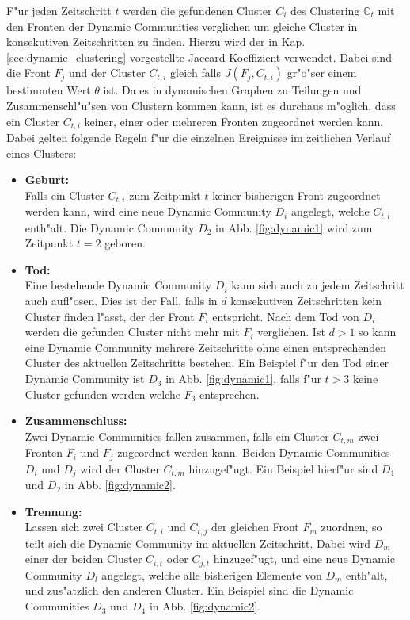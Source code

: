 \documentclass[journal]{vgtc}
\begin{document}
    F"ur jeden Zeitschritt $t$ werden die gefundenen Cluster $C_i$ des Clustering $\mathbb{C}_t$ mit den Fronten der Dynamic Communities
    verglichen um gleiche Cluster in konsekutiven Zeitschritten zu finden. Hierzu wird der in Kap. \ref{sec:dynamic_clustering}
    vorgestellte Jaccard-Koeffizient verwendet. Dabei sind die
    Front $F_j$ und der Cluster $C_{t,i}$ gleich falls $J(F_j,C_{t,i})$ gr"o"ser einem bestimmten Wert $\theta$ ist. Da es in dynamischen Graphen
    zu Teilungen und Zusammenschl"u"sen von Clustern kommen kann, ist es durchaus m"oglich, dass ein Cluster $C_{t,i}$ keiner, einer oder mehreren 
    Fronten zugeordnet werden kann. Dabei gelten folgende Regeln f"ur die einzelnen Ereignisse im zeitlichen Verlauf eines Clusters:
    \begin{itemize}
      \item \textbf{Geburt:} \hfill \\
	    Falls ein Cluster $C_{t,i}$ zum Zeitpunkt $t$ keiner bisherigen Front zugeordnet werden kann, wird eine neue Dynamic Community
	    $D_i$ angelegt, welche $C_{t,i}$ enth"alt. Die Dynamic Community $D_2$ in Abb. \ref{fig:dynamic1} wird zum Zeitpunkt $t=2$ geboren. 
      \item \textbf{Tod:} \hfill \\
	    Eine bestehende Dynamic Community $D_i$ kann sich auch zu jedem Zeitschritt auch aufl"osen. Dies ist der Fall, falls in $d$ konsekutiven
	    Zeitschritten kein Cluster finden l"asst, der der Front $F_i$ entspricht. Nach dem Tod von $D_i$ werden die gefunden Cluster nicht mehr mit
	    $F_i$ verglichen. Ist $d>1$ so kann eine Dynamic Community mehrere Zeitschritte ohne einen entsprechenden Cluster des aktuellen Zeitschritts bestehen.
	    Ein Beispiel f"ur den Tod einer Dynamic Community ist $D_3$ in Abb. \ref{fig:dynamic1}, falls f"ur $t>3$ keine Cluster gefunden werden welche $F_3$ entsprechen.
      \item \textbf{Zusammenschluss:} \hfill \\
	    Zwei Dynamic Communities fallen zusammen, falls ein Cluster $C_{t,m}$ zwei Fronten $F_i$ und $F_j$ zugeordnet werden kann. Beiden Dynamic Communities
	    $D_i$ und $D_j$ wird der Cluster $C_{t,m}$ hinzugef"ugt. Ein Beispiel hierf"ur sind $D_1$ und $D_2$ in Abb. \ref{fig:dynamic2}.
      \item \textbf{Trennung:} \hfill \\
	    Lassen sich zwei Cluster $C_{t,i}$ und $C_{t,j}$ der gleichen Front $F_m$ zuordnen, so teilt sich die Dynamic Community im aktuellen Zeitschritt.
	    Dabei wird $D_m$ einer der beiden Cluster $C_{i,t}$ oder $C_{j,t}$ hinzugef"ugt, und eine neue Dynamic Community $D_l$ angelegt, welche alle bisherigen
	    Elemente von $D_m$ enth"alt, und zus"atzlich den anderen Cluster.
	    Ein Beispiel sind die Dynamic Communities $D_3$ und $D_4$ in Abb. \ref{fig:dynamic2}.
    \end{itemize}
\end{document}

